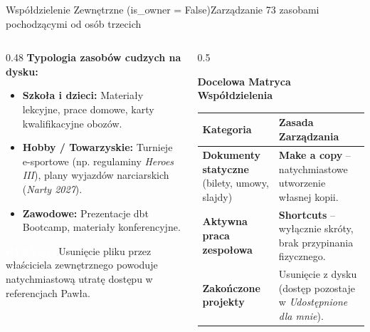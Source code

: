 \documentclass[aspectratio=169, 10pt]{beamer}
\newcommand{\badge}[2]{{\setlength{\fboxsep}{2pt}\colorbox{#1}{\textcolor{white}{\sffamily\bfseries\tiny #2}}}}
\newcommand{\alertTag}[1]{{\badge{brandRed}{#1}}}
\begin{document}
\begin{frame}{Współdzielenie Zewnętrzne (is\_owner = False)}{Zarządzanie 73 zasobami pochodzącymi od osób trzecich}
  \begin{columns}[T]
    \begin{column}{0.48\textwidth}
      \textbf{Typologia zasobów cudzych na dysku:}
      \begin{itemize}
        \item \textbf{Szkoła i dzieci:} Materiały lekcyjne, prace domowe, karty kwalifikacyjne obozów.
        \item \textbf{Hobby / Towarzyskie:} Turnieje e-sportowe (np. regulaminy \textit{Heroes III}), plany wyjazdów narciarskich (\textit{Narty 2027}).
        \item \textbf{Zawodowe:} Prezentacje dbt Bootcamp, materiały konferencyjne.
      \end{itemize}

      \vspace{0.2cm}
      \footnotesize \alertTag{RYZYKO} Usunięcie pliku przez właściciela zewnętrznego powoduje natychmiastową utratę dostępu w referencjach Pawła.
    \end{column}

    \begin{column}{0.5\textwidth}
      \begin{block}{\textbf{Docelowa Matryca Współdzielenia}}
        \small
        \begin{tabularx}{\textwidth}{p{2.8cm}X}
          \toprule
          \textbf{Kategoria} & \textbf{Zasada Zarządzania} \\
          \midrule
          \textbf{Dokumenty statyczne} (bilety, umowy, slajdy) & \textbf{Make a copy} -- natychmiastowe utworzenie własnej kopii. \\
          \addlinespace
          \textbf{Aktywna praca zespołowa} & \textbf{Shortcuts} -- wyłącznie skróty, brak przypinania fizycznego. \\
          \addlinespace
          \textbf{Zakończone projekty} & Usunięcie z dysku (dostęp pozostaje w \textit{Udostępnione dla mnie}). \\
          \bottomrule
        \end{tabularx}
      \end{block}
    \end{column}
  \end{columns}
\end{frame}
\end{document}
